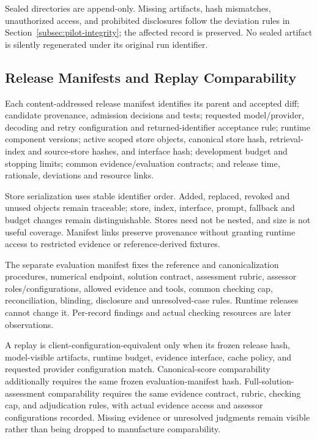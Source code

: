 \documentclass[10pt]{article} %
\providecommand{\1}{\mathbf{1}}  %
\theoremstyle{remark}
\theoremstyle{definition}
\begin{document}
Sealed directories are append-only. Missing artifacts, hash
mismatches, unauthorized access, and prohibited disclosures follow
the deviation rules in Section~\ref{subsec:pilot-integrity}; the
affected record is preserved. No sealed artifact is silently
regenerated under its original run identifier.

\subsection{Release Manifests and Replay Comparability}
\label{subsec:execution-manifests}

Each content-addressed release manifest identifies its parent and accepted
diff; candidate provenance, admission decisions and tests; requested
model/provider, decoding and retry configuration and returned-identifier
acceptance rule; runtime component versions; active scoped store objects,
canonical store hash, retrieval-index and source-store hashes, and interface
hash; development budget and stopping limits; common evidence/evaluation
contracts; and release time, rationale, deviations and resource links.

Store serialization uses stable identifier order. Added, replaced, revoked
and unused objects remain traceable; store, index, interface, prompt,
fallback and budget changes remain distinguishable. Stores need not be
nested, and size is not useful coverage. Manifest links preserve provenance
without granting runtime access to restricted evidence or reference-derived
fixtures.

The separate evaluation manifest fixes the reference and canonicalization
procedures, numerical endpoint, solution contract, assessment rubric,
assessor roles/configurations, allowed evidence and tools, common checking
cap, reconciliation, blinding, disclosure and unresolved-case rules.
Runtime releases cannot change it. Per-record findings and actual checking
resources are later observations.

A replay is client-configuration-equivalent only when its frozen
release hash, model-visible artifacts, runtime budget, evidence
interface, cache policy, and requested provider configuration match.
Canonical-score comparability additionally requires the same frozen
evaluation-manifest hash. Full-solution-assessment comparability
requires the same evidence contract, rubric, checking cap, and
adjudication rules, with actual evidence access and assessor
configurations recorded. Missing evidence or unresolved judgments
remain visible rather than being dropped to manufacture comparability.
\end{document}
